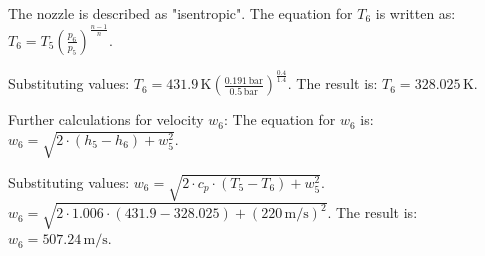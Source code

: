 The nozzle is described as "isentropic".  
The equation for \( T_6 \) is written as:  
\( T_6 = T_5 \left( \frac{p_6}{p_5} \right)^{\frac{n-1}{n}} \).  

Substituting values:  
\( T_6 = 431.9 \, \text{K} \left( \frac{0.191 \, \text{bar}}{0.5 \, \text{bar}} \right)^{\frac{0.4}{1.4}} \).  
The result is:  
\( T_6 = 328.025 \, \text{K} \).  

Further calculations for velocity \( w_6 \):  
The equation for \( w_6 \) is:  
\( w_6 = \sqrt{2 \cdot (h_5 - h_6) + w_5^2} \).  

Substituting values:  
\( w_6 = \sqrt{2 \cdot c_p \cdot (T_5 - T_6) + w_5^2} \).  
\( w_6 = \sqrt{2 \cdot 1.006 \cdot (431.9 - 328.025) + (220 \, \text{m/s})^2} \).  
The result is:  
\( w_6 = 507.24 \, \text{m/s} \).